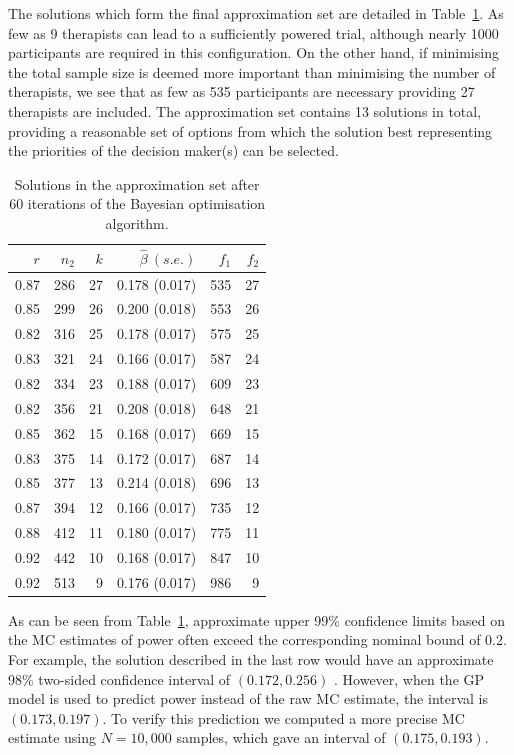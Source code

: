 \documentclass{article} %
\begin{document}
The solutions which form the final approximation set are detailed in Table~\ref{tab:CC_single_run}. As few as 9 therapists can lead to a sufficiently powered trial, although nearly 1000 participants are required in this configuration. On the other hand, if minimising the total sample size is deemed more important than minimising the number of therapists, we see that as few as 535 participants are necessary providing 27 therapists are included. The approximation set contains 13 solutions in total, providing a reasonable set of options from which the solution best representing the priorities of the decision maker(s) can be selected.

\begin{table}
\centering
\begin{tabular}{rrrrrr}
\toprule
$r$ & $n_{2}$ & $k$ & $\hat{\beta}~(s.e.)$ & $f_{1}$ & $f_{2}$ \\ 
\midrule
0.87 & 286 & 27 & 0.178 (0.017) & 535 & 27 \\ 
0.85 & 299 & 26 & 0.200 (0.018) & 553 & 26 \\ 
0.82 & 316 & 25 & 0.178 (0.017) & 575 & 25 \\ 
0.83 & 321 & 24 & 0.166 (0.017) & 587 & 24 \\ 
0.82 & 334 & 23 & 0.188 (0.017) & 609 & 23 \\ 
0.82 & 356 & 21 & 0.208 (0.018) & 648 & 21 \\ 
0.85 & 362 & 15 & 0.168 (0.017) & 669 & 15 \\ 
0.83 & 375 & 14 & 0.172 (0.017) & 687 & 14 \\ 
0.85 & 377 & 13 & 0.214 (0.018) & 696 & 13 \\ 
0.87 & 394 & 12 & 0.166 (0.017) & 735 & 12 \\ 
0.88 & 412 & 11 & 0.180 (0.017) & 775 & 11 \\ 
0.92 & 442 & 10 & 0.168 (0.017) & 847 & 10 \\ 
0.92 & 513 & 9 & 0.176 (0.017) & 986 & 9 \\ 
\bottomrule
\end{tabular}
\caption{Solutions in the approximation set after 60 iterations of the Bayesian optimisation algorithm.}
\label{tab:CC_single_run}
\end{table}


As can be seen from Table~\ref{tab:CC_single_run}, approximate upper 99\% confidence limits based on the MC estimates of power often exceed the corresponding nominal bound of 0.2. For example, the solution described in the last row would have an approximate 98\% two-sided confidence interval of $(0.172, 0.256)$ . However, when the GP model is used to predict power instead of the raw MC estimate, the interval is $(0.173, 0.197)$.  To verify this prediction we computed a more precise MC estimate using $N = 10,000$ samples, which gave an interval of $(0.175, 0.193)$.
\end{document}

